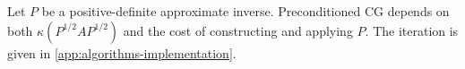 Let \(P\) be a positive-definite approximate inverse. Preconditioned CG depends
on both \(\kappa(P^{1/2}AP^{1/2})\) and the cost of constructing and applying
\(P\). The iteration is given in
\cref{app:algorithms-implementation}.











